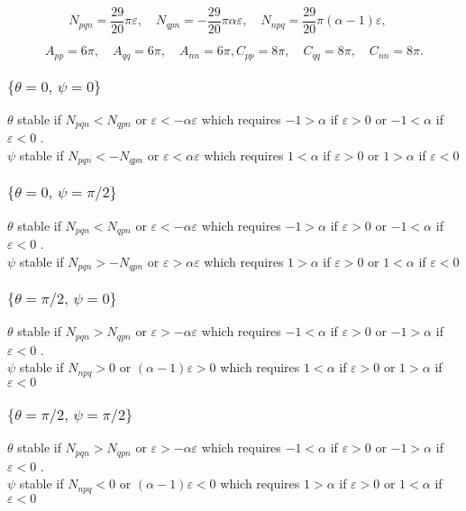 \documentclass[12pt]{My_preprint}
\begin{document}
$$
N_{pqn} = \frac{29}{20}\pi \varepsilon, \quad
N_{qpn} = -\frac{29}{20}\pi \alpha \varepsilon, \quad
N_{npq} = \frac{29}{20}\pi (\alpha - 1)\varepsilon, \quad $$

$$
A_{pp} = 6\pi, \quad A_{qq} = 6\pi,  \quad A_{nn} = 6\pi ,
C_{pp} = 8\pi, \quad C_{qq} = 8\pi,  \quad C_{nn} = 8\pi .
$$

\subsubsection{$\{\theta = 0, \, \psi = 0\}$}

$\theta$ stable if $N_{pqn} < N_{qpn}$ or $\varepsilon < -\alpha \varepsilon$ which requires  $-1>\alpha$ if  $\varepsilon > 0$ or $-1 < \alpha$ if $\varepsilon < 0$ .\\
$\psi$ stable if $N_{pqn} < -N_{qpn}$ or $\varepsilon < \alpha \varepsilon$ which requires  $1<\alpha$ if  $\varepsilon > 0$ or $1 > \alpha$ if $\varepsilon < 0$


\subsubsection{$\{\theta = 0, \, \psi = \pi/2\}$}
$\theta$ stable if $N_{pqn} < N_{qpn}$ or $\varepsilon < -\alpha \varepsilon$ which requires  $-1>\alpha$ if  $\varepsilon > 0$ or $-1 < \alpha$ if $\varepsilon < 0$ .\\
$\psi$ stable if $N_{pqn} > -N_{qpn}$ or $\varepsilon > \alpha \varepsilon$ which requires  $1>\alpha$ if  $\varepsilon > 0$ or $1 < \alpha$ if $\varepsilon < 0$

\subsubsection{$\{\theta = \pi/2, \, \psi = 0\}$}
$\theta$ stable if $N_{pqn} > N_{qpn}$ or $\varepsilon > -\alpha \varepsilon$ which requires  $-1<\alpha$ if  $\varepsilon > 0$ or $-1 > \alpha$ if $\varepsilon < 0$ .\\
$\psi$ stable if $N_{npq}>0$ or $(\alpha - 1)\varepsilon > 0$ which requires  $1 <\alpha$ if  $\varepsilon > 0$ or $1 > \alpha$ if $\varepsilon < 0$

\subsubsection{$\{\theta = \pi/2, \, \psi = \pi/2\}$}
$\theta$ stable if $N_{pqn} > N_{qpn}$ or $\varepsilon > -\alpha \varepsilon$ which requires  $-1<\alpha$ if  $\varepsilon > 0$ or $-1 > \alpha$ if $\varepsilon < 0$ .\\
$\psi$ stable if $N_{npq}<0$ or $(\alpha - 1)\varepsilon < 0$ which requires  $1 >\alpha$ if  $\varepsilon > 0$ or $1 < \alpha$ if $\varepsilon < 0$
\end{document}
